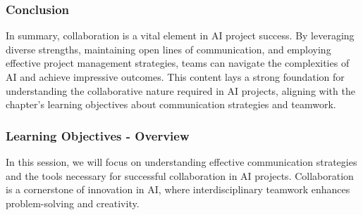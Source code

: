 \documentclass[aspectratio=169]{beamer}
\begin{document}
\begin{frame}[fragile]
    \frametitle{Conclusion}
    In summary, collaboration is a vital element in AI project success. By leveraging diverse strengths, maintaining open lines of communication, and employing effective project management strategies, teams can navigate the complexities of AI and achieve impressive outcomes. This content lays a strong foundation for understanding the collaborative nature required in AI projects, aligning with the chapter's learning objectives about communication strategies and teamwork.
\end{frame}

\begin{frame}[fragile]
    \frametitle{Learning Objectives - Overview}
    In this session, we will focus on understanding effective communication strategies and the tools necessary for successful collaboration in AI projects. Collaboration is a cornerstone of innovation in AI, where interdisciplinary teamwork enhances problem-solving and creativity.
\end{frame}
\end{document}

